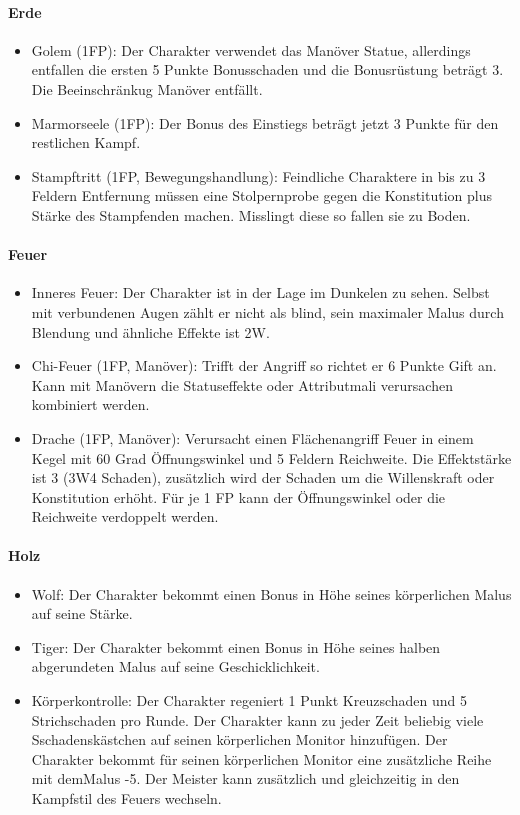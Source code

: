 \documentclass{article}
\begin{document}
\paragraph{Erde}

\begin{itemize}
\item Golem (1FP): Der Charakter verwendet das Manöver Statue, allerdings entfallen die ersten 5 Punkte Bonusschaden und die Bonusrüstung beträgt 3. Die Beeinschränkug Manöver entfällt.
\item Marmorseele (1FP): Der Bonus des Einstiegs beträgt jetzt 3 Punkte für den restlichen Kampf.
\item Stampftritt (1FP, Bewegungshandlung): Feindliche Charaktere in bis zu 3 Feldern Entfernung müssen eine Stolpernprobe gegen die Konstitution plus Stärke des Stampfenden machen. Misslingt diese so fallen sie zu Boden.
\end{itemize}

\paragraph{Feuer}

\begin{itemize}
\item Inneres Feuer: Der Charakter ist in der Lage im Dunkelen zu sehen. Selbst mit verbundenen Augen zählt er nicht als blind, sein maximaler Malus durch Blendung und ähnliche Effekte ist 2W.
\item Chi-Feuer (1FP, Manöver): Trifft der Angriff so richtet er 6 Punkte Gift an. Kann mit Manövern die Statuseffekte oder Attributmali verursachen kombiniert werden.
\item Drache (1FP, Manöver): Verursacht einen Flächenangriff Feuer in einem Kegel mit 60 Grad Öffnungswinkel und 5 Feldern Reichweite. Die Effektstärke ist 3 (3W4 Schaden), zusätzlich wird der Schaden um die Willenskraft oder Konstitution erhöht. Für je 1 FP kann der Öffnungswinkel oder die Reichweite verdoppelt werden.
\end{itemize}

\paragraph{Holz}

\begin{itemize}
\item Wolf: Der Charakter bekommt einen Bonus in Höhe seines körperlichen Malus auf seine Stärke.
\item Tiger: Der Charakter bekommt einen Bonus in Höhe seines halben abgerundeten Malus auf seine Geschicklichkeit.
\item Körperkontrolle: Der Charakter regeniert 1 Punkt Kreuzschaden und 5 Strichschaden pro Runde. Der Charakter kann zu jeder Zeit beliebig viele Sschadenskästchen auf seinen körperlichen Monitor hinzufügen. Der Charakter bekommt für seinen körperlichen Monitor eine zusätzliche Reihe mit demMalus -5. Der Meister kann zusätzlich und gleichzeitig in den Kampfstil des Feuers wechseln.
\end{itemize}
\end{document}
